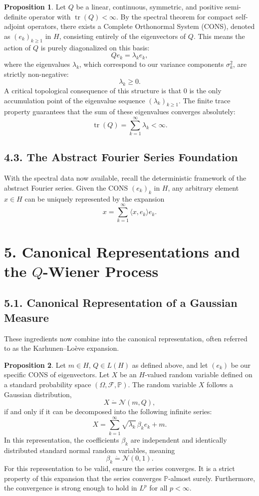\documentclass[11pt]{article}
\theoremstyle{definition}
\newtheorem{proposition}{Proposition}
\theoremstyle{remark}
\DeclareMathOperator{\tr}{tr}
\begin{document}
\begin{proposition}
Let $Q$ be a linear, continuous, symmetric, and positive semi-definite operator with \(\tr(Q)<\infty\). By the spectral theorem for compact self-adjoint operators, there exists a Complete Orthonormal System (CONS), denoted as \((e_k)_{k\ge 1}\) in $H$, consisting entirely of the eigenvectors of $Q$. This means the action of $Q$ is purely diagonalized on this basis:
\[
Qe_k=\lambda_k e_k,
\]
where the eigenvalues \(\lambda_k\), which correspond to our variance components \(\sigma_k^2\), are strictly non-negative:
\[
\lambda_k\ge 0.
\]
A critical topological consequence of this structure is that \(0\) is the only accumulation point of the eigenvalue sequence \((\lambda_k)_{k\ge 1}\). The finite trace property guarantees that the sum of these eigenvalues converges absolutely:
\[
\tr(Q)=\sum_{k=1}^\infty \lambda_k<\infty.
\]
\end{proposition}

\subsection*{4.3. The Abstract Fourier Series Foundation}
With the spectral data now available, recall the deterministic framework of the abstract Fourier series. Given the CONS \((e_k)_k\) in $H$, any arbitrary element \(x\in H\) can be uniquely represented by the expansion
\[
x=\sum_{k=1}^\infty \langle x,e_k\rangle e_k.
\]

\section*{5. Canonical Representations and the \(Q\)-Wiener Process}

\subsection*{5.1. Canonical Representation of a Gaussian Measure}
These ingredients now combine into the canonical representation, often referred to as the Karhunen--Lo\`eve expansion.

\begin{proposition}
Let \(m\in H\), \(Q\in L(H)\) as defined above, and let \((e_k)\) be our specific CONS of eigenvectors. Let \(X\) be an \(H\)-valued random variable defined on a standard probability space \((\Omega,\mathcal F,\mathbb P)\). The random variable \(X\) follows a Gaussian distribution,
\[
X\stackrel{\hat{\ }}{=}\mathcal N(m,Q),
\]
if and only if it can be decomposed into the following infinite series:
\[
X=\sum_{k=1}^\infty \sqrt{\lambda_k}\,\beta_k e_k+m.
\]
In this representation, the coefficients \(\beta_k\) are independent and identically distributed standard normal random variables, meaning
\[
\beta_k\stackrel{\hat{\ }}{=}\mathcal N(0,1).
\]
For this representation to be valid, ensure the series converges. It is a strict property of this expansion that the series converges \(\mathbb P\)-almost surely. Furthermore, the convergence is strong enough to hold in \(L^p\) for all \(p<\infty\).
\end{proposition}
\end{document}
